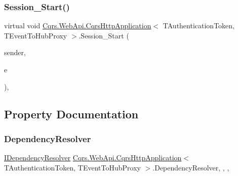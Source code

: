 \subsubsection{\texorpdfstring{Session\+\_\+\+Start()}{Session\_Start()}}
{\footnotesize\ttfamily virtual void \hyperlink{classCqrs_1_1WebApi_1_1CqrsHttpApplication}{Cqrs.\+Web\+Api.\+Cqrs\+Http\+Application}$<$ T\+Authentication\+Token, T\+Event\+To\+Hub\+Proxy $>$.Session\+\_\+\+Start (\begin{DoxyParamCaption}\item[{object}]{sender,  }\item[{Event\+Args}]{e }\end{DoxyParamCaption})\hspace{0.3cm}{\ttfamily [protected]}, {\ttfamily [virtual]}}



\subsection{Property Documentation}
\mbox{\label{classCqrs_1_1WebApi_1_1CqrsHttpApplication_a9d6bd681b84a94ae58abdb0b5cf2cbfd_a9d6bd681b84a94ae58abdb0b5cf2cbfd}} 
\subsubsection{\texorpdfstring{Dependency\+Resolver}{DependencyResolver}}
{\footnotesize\ttfamily \hyperlink{interfaceCqrs_1_1Configuration_1_1IDependencyResolver}{I\+Dependency\+Resolver} \hyperlink{classCqrs_1_1WebApi_1_1CqrsHttpApplication}{Cqrs.\+Web\+Api.\+Cqrs\+Http\+Application}$<$ T\+Authentication\+Token, T\+Event\+To\+Hub\+Proxy $>$.Dependency\+Resolver\hspace{0.3cm}{\ttfamily [static]}, {\ttfamily [get]}, {\ttfamily [set]}, {\ttfamily [protected]}}

